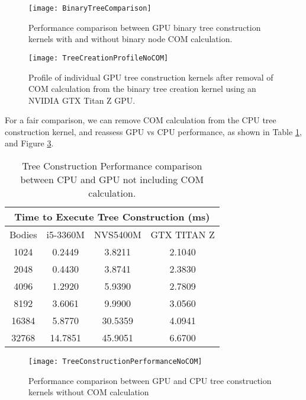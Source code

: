 \documentclass{thesis}
\begin{document}
\begin{figure}[h]
    \caption{Performance comparison between GPU binary tree construction kernels with and without binary node COM calculation.}
    \label{fig:BinaryTreeComparison}
    \centering
    \texttt{[image: BinaryTreeComparison]}
\end{figure}
\begin{figure}[h]
    \caption{Profile of individual GPU tree construction kernels after removal of COM calculation from the binary tree creation kernel using an NVIDIA GTX Titan Z GPU.}
    \label{fig:TreeCreationProfileNoCOM}
    \centering
    \texttt{[image: TreeCreationProfileNoCOM]}
\end{figure}
For a fair comparison, we can remove COM calculation from the CPU tree construction kernel, and reassess GPU vs CPU performance, as shown in Table \ref{tab:treeConstructionPerformanceNoCOM}, and Figure \ref{fig:TreeConstructionPerformanceNoCOM}.
\begin{table}
    \centering
    \caption{Tree Construction Performance comparison between CPU and GPU not including COM calculation.}
    \label{tab:treeConstructionPerformanceNoCOM}
    \begin{tabular}{|c|||c||c|c|}
        \hline
        \multicolumn{4}{|c|}{Time to Execute Tree Construction (ms)}\\
        \hline
        Bodies & i5-3360M & NVS5400M & GTX TITAN Z \\
        \hline
        1024 & 0.2449 & 3.8211 & 2.1040\\
        2048 & 0.4430 & 3.8741 & 2.3830\\
        4096 & 1.2920 & 5.9390 & 2.7809\\
        8192 & 3.6061 & 9.9900 & 3.0560\\
        16384 & 5.8770 & 30.5359 & 4.0941\\
        32768 & 14.7851 & 45.9051 & 6.6700\\
        \hline
    \end{tabular}
\end{table}

\begin{figure}[h]
    \caption{\label{fig:TreeConstructionPerformanceNoCOM} Performance comparison between GPU and CPU tree construction kernels without COM calculation}
    \centering
    \texttt{[image: TreeConstructionPerformanceNoCOM]}
\end{figure}
\end{document}
